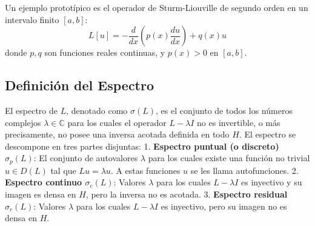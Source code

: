 \documentclass[a4paper]{article}
\begin{document}
Un ejemplo prototípico es el operador de Sturm-Liouville de segundo orden en un intervalo finito $[a, b]$:
$$ L[u] = -\frac{d}{dx}\left( p(x) \frac{du}{dx} \right) + q(x)u $$
donde $p, q$ son funciones reales continuas, y $p(x) > 0$ en $[a, b]$.

\subsection*{Definición del Espectro}
El espectro de $L$, denotado como $\sigma(L)$, es el conjunto de todos los números complejos $\lambda \in \mathbb{C}$ para los cuales el operador $L - \lambda I$ no es invertible, o más precisamente, no posee una inversa acotada definida en todo $H$. El espectro se descompone en tres partes disjuntas:
1. \textbf{Espectro puntual (o discreto) $\sigma_p(L)$}: El conjunto de autovalores $\lambda$ para los cuales existe una función no trivial $u \in D(L)$ tal que $Lu = \lambda u$. A estas funciones $u$ se les llama autofunciones.
2. \textbf{Espectro continuo $\sigma_c(L)$}: Valores $\lambda$ para los cuales $L - \lambda I$ es inyectivo y su imagen es densa en $H$, pero la inversa no es acotada.
3. \textbf{Espectro residual $\sigma_r(L)$}: Valores $\lambda$ para los cuales $L - \lambda I$ es inyectivo, pero su imagen no es densa en $H$.
\end{document}
